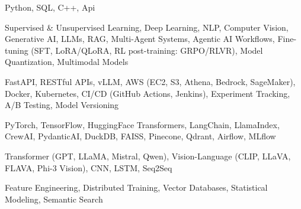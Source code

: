 \documentclass[letter,10pt]{article}
\begin{document}
 Python, SQL, C++, Api\par\vspace{2pt}

 Supervised \& Unsupervised Learning, Deep Learning, NLP, Computer Vision, Generative AI, LLMs, RAG, Multi-Agent Systems, Agentic AI Workflows, Fine-tuning (SFT, LoRA/QLoRA, RL post-training: GRPO/RLVR), Model Quantization, Multimodal Models\par\vspace{2pt}

 FastAPI, RESTful APIs, vLLM, AWS (EC2, S3, Athena, Bedrock, SageMaker), Docker, Kubernetes, CI/CD (GitHub Actions, Jenkins), Experiment Tracking, A/B Testing, Model Versioning\par\vspace{2pt}

 PyTorch, TensorFlow, HuggingFace Transformers, LangChain, LlamaIndex, CrewAI, PydanticAI, DuckDB, FAISS, Pinecone, Qdrant, Airflow, MLflow\par\vspace{2pt}

 Transformer (GPT, LLaMA, Mistral, Qwen), Vision-Language (CLIP, LLaVA, FLAVA, Phi-3 Vision), CNN, LSTM, Seq2Seq\par\vspace{2pt}

 Feature Engineering, Distributed Training, Vector Databases, Statistical Modeling, Semantic Search
\end{document}
